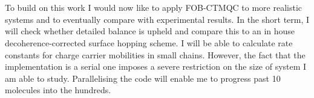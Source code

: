 \\\\
To build on this work I would now like to apply FOB-CTMQC to more realistic systems and to eventually compare with experimental results. In the short term, I will check whether detailed balance is upheld and compare this to an in house decoherence-corrected surface hopping scheme. I will be able to calculate rate constants for charge carrier mobilities in small chains. However, the fact that the implementation is a serial one imposes a severe restriction on the size of system I am able to study. Parallelising the code will enable me to progress past 10 molecules into the hundreds.
